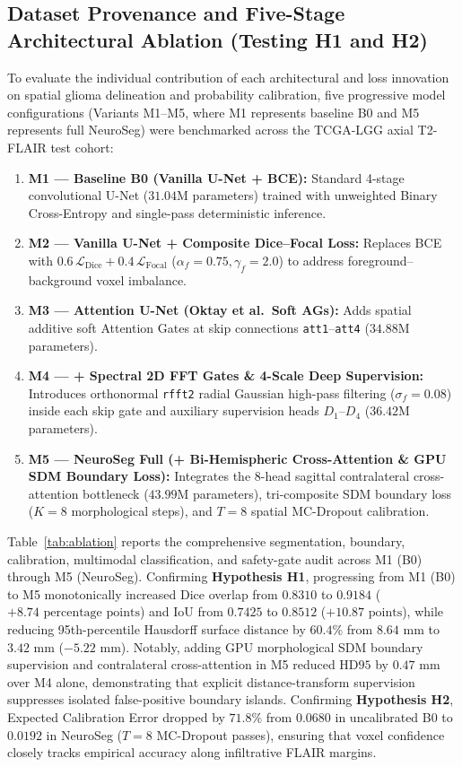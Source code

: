 \documentclass[journal,onecolumn,10pt]{IEEEtran}
\begin{document}
\subsection{Dataset Provenance and Five-Stage Architectural Ablation (Testing H1 and H2)}
To evaluate the individual contribution of each architectural and loss innovation on spatial glioma delineation and probability calibration, five progressive model configurations (Variants M1--M5, where M1 represents baseline B0 and M5 represents full NeuroSeg) were benchmarked across the TCGA-LGG axial T2-FLAIR test cohort:
\begin{enumerate}
    \item \textbf{M1 --- Baseline B0 (Vanilla U-Net + BCE):} Standard 4-stage convolutional U-Net ($31.04\text{M}$ parameters) trained with unweighted Binary Cross-Entropy and single-pass deterministic inference.
    \item \textbf{M2 --- Vanilla U-Net + Composite Dice--Focal Loss:} Replaces BCE with $0.6\,\mathcal{L}_{\text{Dice}} + 0.4\,\mathcal{L}_{\text{Focal}}$ ($\alpha_f = 0.75, \gamma_f = 2.0$) to address foreground--background voxel imbalance.
    \item \textbf{M3 --- Attention U-Net (Oktay et al.\ Soft AGs):} Adds spatial additive soft Attention Gates at skip connections \texttt{att1}--\texttt{att4} ($34.88\text{M}$ parameters).
    \item \textbf{M4 --- + Spectral 2D FFT Gates \& 4-Scale Deep Supervision:} Introduces orthonormal \texttt{rfft2} radial Gaussian high-pass filtering ($\sigma_f = 0.08$) inside each skip gate and auxiliary supervision heads $D_1$--$D_4$ ($36.42\text{M}$ parameters).
    \item \textbf{M5 --- NeuroSeg Full (+ Bi-Hemispheric Cross-Attention \& GPU SDM Boundary Loss):} Integrates the 8-head sagittal contralateral cross-attention bottleneck ($43.99\text{M}$ parameters), tri-composite SDM boundary loss ($K = 8$ morphological steps), and $T = 8$ spatial MC-Dropout calibration.
\end{enumerate}

Table~\ref{tab:ablation} reports the comprehensive segmentation, boundary, calibration, multimodal classification, and safety-gate audit across M1 (B0) through M5 (NeuroSeg). Confirming \textbf{Hypothesis H1}, progressing from M1 (B0) to M5 monotonically increased Dice overlap from $0.8310$ to $0.9184$ ($+8.74\text{ percentage points}$) and IoU from $0.7425$ to $0.8512$ ($+10.87\text{ points}$), while reducing 95th-percentile Hausdorff surface distance by $60.4\%$ from $8.64\text{ mm}$ to $3.42\text{ mm}$ ($-5.22\text{ mm}$). Notably, adding GPU morphological SDM boundary supervision and contralateral cross-attention in M5 reduced $\text{HD95}$ by $0.47\text{ mm}$ over M4 alone, demonstrating that explicit distance-transform supervision suppresses isolated false-positive boundary islands. Confirming \textbf{Hypothesis H2}, Expected Calibration Error dropped by $71.8\%$ from $0.0680$ in uncalibrated B0 to $0.0192$ in NeuroSeg ($T = 8$ MC-Dropout passes), ensuring that voxel confidence closely tracks empirical accuracy along infiltrative FLAIR margins.
\end{document}
